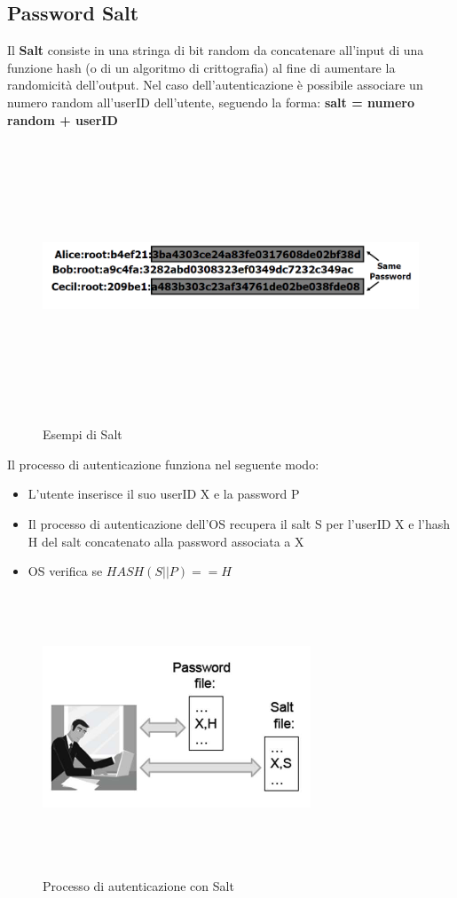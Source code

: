 \subsection{Password Salt}
Il \textbf{Salt} consiste in una stringa di bit random da concatenare all'input di una funzione hash (o di un algoritmo di crittografia) al fine di aumentare la randomicità dell'output. Nel caso dell'autenticazione è possibile associare un numero random all'userID dell'utente, seguendo la forma: \newline \newline
\textbf{salt = numero random + userID} \newline \newline
\begin{figure}[htbp]
	\centering%
	\subfigure%
	{\includegraphics[height=8cm, width=13cm, keepaspectratio]{Immagini/sistemi_operativi/password.png}}
	\caption{Esempi di Salt \label{fig:salt}} 	
\end{figure}
\newpage
Il processo di autenticazione funziona nel seguente modo:
\begin{itemize}
  \item L'utente inserisce il suo userID X e la password P
  \item Il processo di autenticazione dell'OS recupera il salt S per l'userID X e l'hash H del salt concatenato alla password associata a X
  \item OS verifica se $HASH(S \vert \vert P) == H$
\end{itemize}
\begin{figure}[htbp]
	\centering%
	\subfigure%
	{\includegraphics[height=8cm, width=8cm, keepaspectratio]{Immagini/sistemi_operativi/password2.png}}
	\caption{Processo di autenticazione con Salt \label{fig:salt}} 	
\end{figure}
